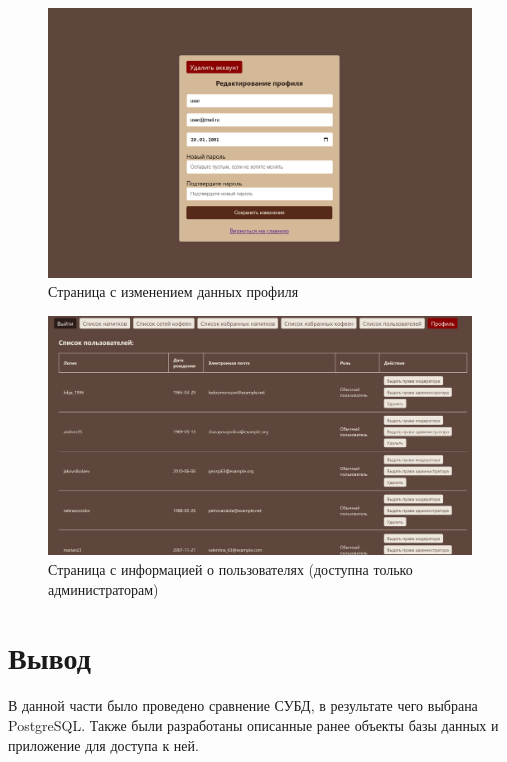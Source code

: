 \begin{figure}[H]
	\centering
	\includegraphics[width=1\linewidth]{img/interface/editprofile.png}
	\caption{Страница с изменением данных профиля}
	\label{editprofile}
\end{figure}

\begin{figure}[H]
	\centering
	\includegraphics[width=1\linewidth]{img/interface/users.png}
	\caption{Страница с информацией о пользователях (доступна только администраторам)}
	\label{users}
\end{figure}


\section*{Вывод}
В данной части было проведено сравнение СУБД, в результате чего выбрана PostgreSQL. Также были разработаны описанные ранее объекты базы данных и приложение для доступа к ней.
